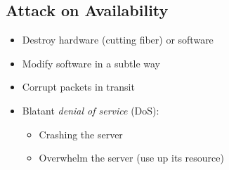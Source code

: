 \subsection{Attack on Availability}
\begin{itemize}[nosep]
    \item Destroy hardware (cutting fiber) or software
    \item Modify software in a subtle way
    \item Corrupt packets in transit
          \begin{figure}[H]
          \end{figure}
    \item Blatant \emph{denial of service} (DoS):
          \begin{itemize}[nosep]
              \item Crashing the server
              \item Overwhelm the server (use up its resource)
          \end{itemize}
\end{itemize}